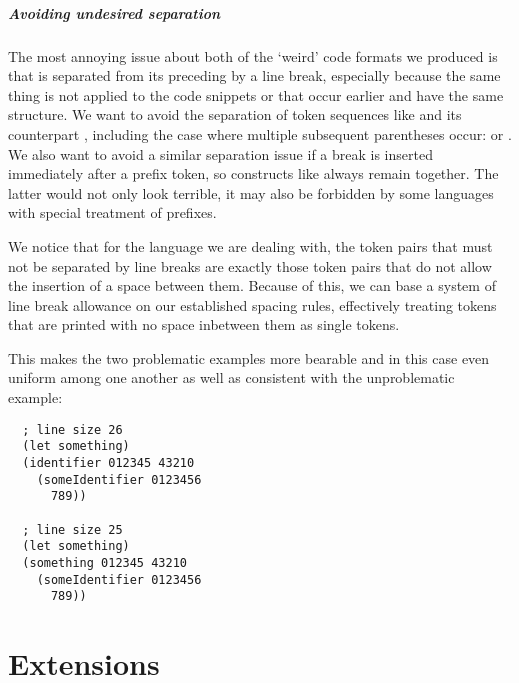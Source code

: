 \subparagraph{Avoiding undesired separation}
The most annoying issue about both of the `weird' code formats we produced is that
 is separated from its preceding  by a line break,
especially because the same thing is not applied to the code snippets
 or  that occur earlier and have the same structure.
We want to avoid the separation of token sequences like 
and its counterpart , including the case where multiple subsequent
parentheses occur:  or .
We also want to avoid a similar separation issue if a break
is inserted immediately after a prefix token,
so constructs like  always remain together.
The latter would not only look terrible, it may also be forbidden by some languages
with special treatment of prefixes.

We notice that for the language we are dealing with,
the token pairs that must not be separated by line breaks
are exactly those token pairs that do not allow the insertion of a space between them.
Because of this, we can base a system of line break allowance on our established spacing rules,
effectively treating tokens that are printed with no space inbetween them as single tokens.

This makes the two problematic examples more bearable
and in this case even uniform among one another
as well as consistent with the unproblematic example:
\begin{verbatim}
  ; line size 26
  (let something)
  (identifier 012345 43210
    (someIdentifier 0123456
      789))

  ; line size 25
  (let something)
  (something 012345 43210
    (someIdentifier 0123456
      789))
\end{verbatim}



\section{Extensions}

